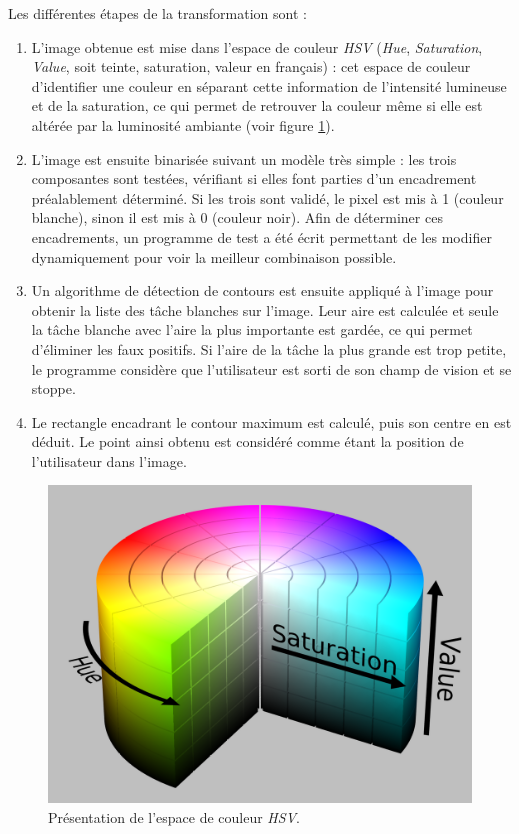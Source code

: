 \documentclass{article}
\begin{document}
Les différentes étapes de la transformation sont : \begin{enumerate}
    \item L'image obtenue est mise dans l'espace de couleur \emph{HSV} (\emph{Hue}, \emph{Saturation}, \emph{Value}, soit teinte, saturation, valeur en français) : cet espace de couleur d'identifier une couleur en séparant cette information de l'intensité lumineuse et de la saturation, ce qui permet de retrouver la couleur même si elle est altérée par la luminosité ambiante (voir figure \ref{hsv}).
    \item L'image est ensuite binarisée suivant un modèle très simple : les trois composantes sont testées, vérifiant si elles font parties d'un encadrement préalablement déterminé. Si les trois sont validé, le pixel est mis à 1 (couleur blanche), sinon il est mis à 0 (couleur noir). Afin de déterminer ces encadrements, un programme de test a été écrit permettant de les modifier dynamiquement pour voir la meilleur combinaison possible. %
    \item Un algorithme de détection de contours est ensuite appliqué à l'image pour obtenir la liste des tâche blanches sur l'image. Leur aire est calculée et seule la tâche blanche avec l'aire la plus importante est gardée, ce qui permet d'éliminer les faux positifs. Si l'aire de la tâche la plus grande est trop petite, le programme considère que l'utilisateur est sorti de son champ de vision et se stoppe.
    \item Le rectangle encadrant le contour maximum est calculé, puis son centre en est déduit. Le point ainsi obtenu est considéré comme étant la position de l'utilisateur dans l'image.
\end{enumerate}

\begin{figure}
    \begin{center}
        \includegraphics[width=0.75\linewidth]{rcs/hsv.png}
    \end{center}
    \caption{Présentation de l'espace de couleur \emph{HSV}.}
    \label{hsv}
\end{figure}
\end{document}
